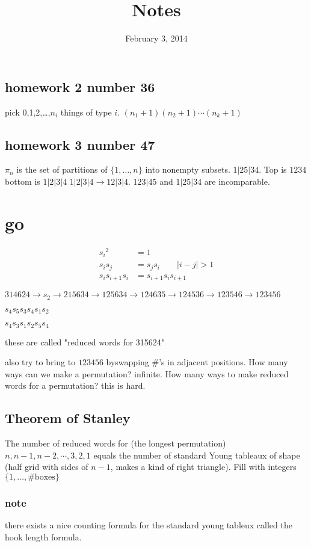 \documentclass{article}
\begin{document}
\title{Notes}
\date{February 3, 2014}
\maketitle
\subsection*{homework 2 number 36}
pick 0,1,2,\dots,$n_i$ things of type $i$. $(n_1+1)(n_2+1)\cdots(n_k+1)$
\subsection*{homework 3 number 47}
$\pi_n$ is the set of partitions of $\{1,\dots,n\}$ into nonempty subsets. $1|25|34$. Top is $1234$ bottom is $1|2|3|4$ $1|2|3|4\to 12|3|4$. $123|45$ and $1|25|34$ are incomparable.

\section*{go}
\begin{align*}
  {s_i}^2&=1\\
  s_is_j&=s_js_i \qquad |i-j|>1\\
  s_is_{i+1}s_i&=s_{i+1}s_is_{i+1}
\end{align*}

$314624\to s_2\to 215634\to 125634\to124635\to124536\to123546\to123456$

$s_4s_5s_3s_4s_1s_2$

$s_4s_3s_1s_2s_5s_4$

these are called "reduced words for 315624"

also try to bring to $123456$ byswapping \#'s in adjacent positions.
How many ways can we make a permutation? infinite. How many ways to make reduced words for a permutation? this is hard.

\subsection*{Theorem of Stanley}
The number of reduced words for (the longest permutation) $n,n-1,n-2,\cdots,3,2,1$ equals the number of standard Young tableaux of shape (half grid with sides of $n-1$, makes a kind of right triangle). Fill with integers $\{1,\dots,\text{\# boxes}\}$
\subsubsection*{note}
there exists a nice counting formula for the standard young tableux called the hook length formula.
\end{document}
